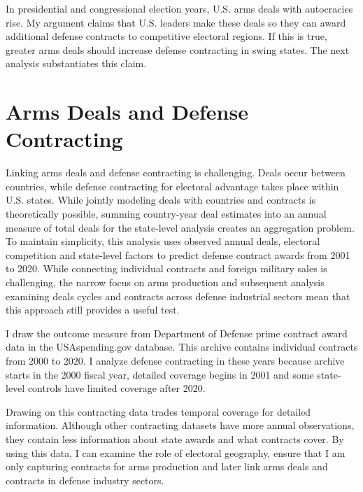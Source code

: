 \documentclass[12pt]{article}
\begin{document}
In presidential and congressional election years, U.S. arms deals with autocracies rise.
My argument claims that U.S. leaders make these deals so they can award additional defense contracts to competitive electoral regions. 
If this is true, greater arms deals should increase defense contracting in swing states. 
The next analysis substantiates this claim.


\section{Arms Deals and Defense Contracting}


Linking arms deals and defense contracting is challenging. 
Deals occur between countries, while defense contracting for electoral advantage takes place within U.S. states.
While jointly modeling deals with countries and contracts is theoretically possible, summing country-year deal estimates into an annual measure of total deals for the state-level analysis creates an aggregation problem. %
To maintain simplicity, this analysis uses observed annual deals, electoral competition and state-level factors to predict defense contract awards from 2001 to 2020. 
While connecting individual contracts and foreign military sales is challenging, the narrow focus on arms production and subsequent analysis examining deals cycles and contracts across defense industrial sectors mean that this approach still provides a useful test. 


I draw the outcome measure from Department of Defense prime contract award data in the USAspending.gov database.%
This archive contains individual contracts from 2000 to 2020.
I analyze defense contracting in these years because archive starts in the 2000 fiscal year, detailed coverage begins in 2001 and some state-level controls have limited coverage after 2020.


Drawing on this contracting data trades temporal coverage for detailed information. 
Although other contracting datasets have more annual observations, they contain less information about state awards and what contracts cover. 
By using this data, I can examine the role of electoral geography, ensure that I am only capturing contracts for arms production and later link arms deals and contracts in defense industry sectors. 
\end{document}
